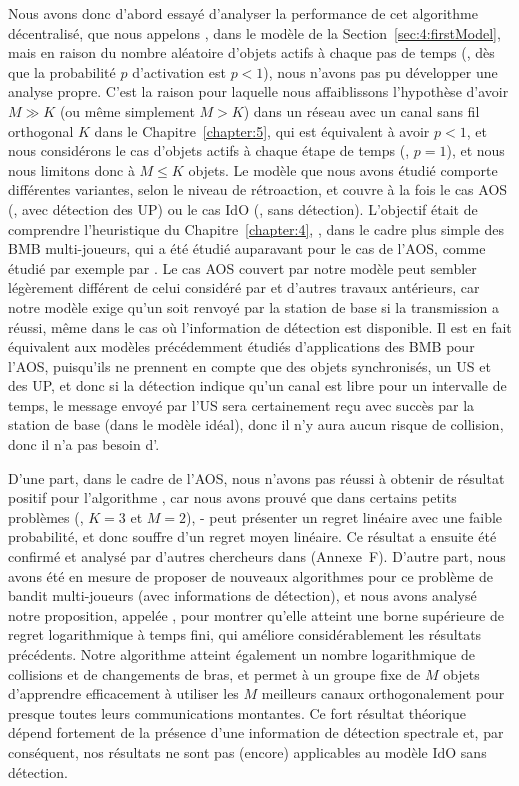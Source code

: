 \begin{resume_fr}
Nous avons donc d'abord essayé d'analyser la performance de cet algorithme décentralisé, que nous appelons \Selfish, dans le modèle de la Section~\ref{sec:4:firstModel},
mais en raison du nombre aléatoire d'objets actifs à chaque pas de temps (\ie, dès que la probabilité $p$ d'activation est $p < 1$), nous n'avons pas pu développer une analyse propre.
%
C'est la raison pour laquelle nous affaiblissons l'hypothèse d'avoir $M \gg K$ (ou même simplement $M > K$) dans un réseau avec un canal sans fil orthogonal $K$ dans le Chapitre~\ref{chapter:5}, qui est équivalent à avoir $p < 1$, et nous considérons le cas d'objets actifs à chaque étape de temps (\ie, $p=1$), et nous nous limitons donc à $M \leq K$ objets.
Le modèle que nous avons étudié comporte différentes variantes, selon le niveau de rétroaction, et couvre à la fois le cas AOS (\ie, avec détection des UP) ou le cas IdO (\ie, sans détection).
L'objectif était de comprendre l'heuristique du Chapitre~\ref{chapter:4}, \Selfish, dans le cadre plus simple des BMB multi-joueurs, qui a été étudié auparavant pour le cas de l'AOS, comme étudié par exemple par \cite{Zhao10,Anandkumar10,Anandkumar11}.
%
Le cas AOS couvert par notre modèle peut sembler légèrement différent de celui considéré par \cite{Jouini10} et d'autres travaux antérieurs,
car notre modèle exige qu'un \Ack{} soit renvoyé par la station de base si la transmission a réussi, même dans le cas où l'information de détection est disponible.
Il est en fait équivalent aux modèles précédemment étudiés d'applications des BMB pour l'AOS, puisqu'ils ne prennent en compte que des objets synchronisés, un US et des UP, et donc si la détection indique qu'un canal est libre pour un intervalle de temps, le message envoyé par l'US sera certainement reçu avec succès par la station de base (dans le modèle idéal), donc il n'y aura aucun risque de collision, donc il n'a pas besoin d'\Ack.


D'une part, dans le cadre de l'AOS, nous n'avons pas réussi à obtenir de résultat positif pour l'algorithme \Selfish, car nous avons prouvé que dans certains petits problèmes (\eg, $K=3$ et $M=2$), \Selfish-\UCB{} peut présenter un regret linéaire avec une faible probabilité, et donc souffre d'un regret moyen linéaire.
Ce résultat a ensuite été confirmé et analysé par d'autres chercheurs dans \cite{BoursierPerchet18} (Annexe~F).
%
D'autre part, nous avons été en mesure de proposer de nouveaux algorithmes pour ce problème de bandit multi-joueurs (avec informations de détection), et nous avons analysé notre proposition, appelée \MCTopM, pour montrer qu'elle atteint une borne supérieure de regret logarithmique à temps fini, qui améliore considérablement les résultats précédents.
Notre algorithme atteint également un nombre logarithmique de collisions et de changements de bras, et permet à un groupe fixe de $M$ objets d'apprendre efficacement à utiliser les $M$ meilleurs canaux orthogonalement pour presque toutes leurs communications montantes.
%
Ce fort résultat théorique dépend fortement de la présence d'une information de détection spectrale et, par conséquent, nos résultats ne sont pas (encore) applicables au modèle IdO sans détection.



\end{resume_fr}
